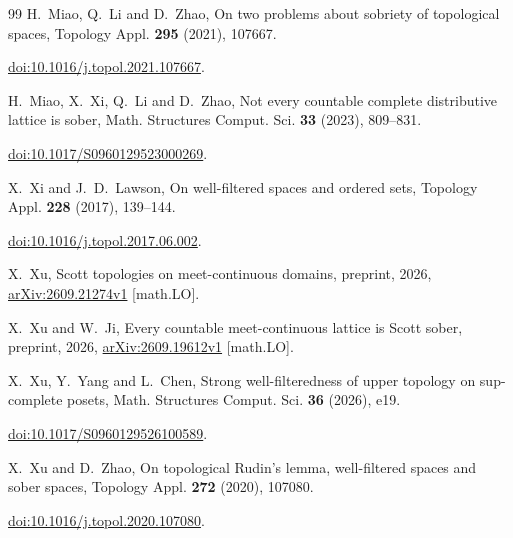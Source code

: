 \documentclass[10pt,a4paper]{article}
\theoremstyle{definition}
\begin{document}
\begin{thebibliography}{99}
H.~Miao, Q.~Li and D.~Zhao,
On two problems about sobriety of topological spaces,
Topology Appl. \textbf{295} (2021), 107667.
\newblock\par\nobreak\noindent\href{https://doi.org/10.1016/j.topol.2021.107667}{doi:10.1016/j.topol.2021.107667}.

H.~Miao, X.~Xi, Q.~Li and D.~Zhao,
Not every countable complete distributive lattice is sober,
Math. Structures Comput. Sci. \textbf{33} (2023), 809--831.
\newblock\par\nobreak\noindent\href{https://doi.org/10.1017/S0960129523000269}{doi:10.1017/S0960129523000269}.

X.~Xi and J.~D.~Lawson, On well-filtered spaces and ordered sets,
Topology Appl. \textbf{228} (2017), 139--144.
\newblock\par\nobreak\noindent\href{https://doi.org/10.1016/j.topol.2017.06.002}{doi:10.1016/j.topol.2017.06.002}.

X.~Xu, Scott topologies on meet-continuous domains,
preprint, 2026, \href{https://arxiv.org/abs/2609.21274v1}{arXiv:2609.21274v1} [math.LO].

X.~Xu and W.~Ji, Every countable meet-continuous lattice is Scott sober,
preprint, 2026, \href{https://arxiv.org/abs/2609.19612v1}{arXiv:2609.19612v1} [math.LO].

X.~Xu, Y.~Yang and L.~Chen,
Strong well-filteredness of upper topology on sup-complete posets,
Math. Structures Comput. Sci. \textbf{36} (2026), e19.
\newblock\par\nobreak\noindent\href{https://doi.org/10.1017/S0960129526100589}{doi:10.1017/S0960129526100589}.

X.~Xu and D.~Zhao,
On topological Rudin's lemma, well-filtered spaces and sober spaces,
Topology Appl. \textbf{272} (2020), 107080.
\newblock\par\nobreak\noindent\href{https://doi.org/10.1016/j.topol.2020.107080}{doi:10.1016/j.topol.2020.107080}.
\end{thebibliography}
\end{document}

